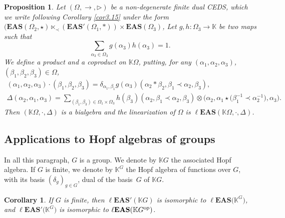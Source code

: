 \documentclass[pdftex]{sigma}
\numberwithin{equation}{section}
\newtheorem{Corollary}[Theorem]{Corollary}
\newtheorem{Proposition}[Theorem]{Proposition}
 { \theoremstyle{definition}
\newtheorem{Definition}[Theorem]{Definition}
\newtheorem{Note}[Theorem]{Note}
\newtheorem{Example}[Theorem]{Example}
\newtheorem{Remark}[Theorem]{Remark}
\newtheorem{Notation}[Theorem]{Notation}}
\newcommand{\eas}{\mathbf{EAS}}
\newcommand{\leas}{\ell\mathbf{EAS}}
\begin{document}
\begin{Proposition}
Let $(\Omega,\rightarrow,\triangleright)$ be a non-degenerate finite dual CEDS, which we write following Corollary {\rm\ref{cor3.15}} under the form
$(\eas(\Omega_2,\star) \ltimes_\prec (\eas'(\Omega_1,*))\times \eas(\Omega_3)$,
Let $g,h\colon\Omega_3\longrightarrow \mathbb{K}$ be two maps such that
\[\sum_{\alpha_3\in \Omega_3} g(\alpha_3)h(\alpha_3)=1.\]
We define a product and a coproduct on $\mathbb{K}\Omega$, putting, for any $(\alpha_1,\alpha_2,\alpha_3)$, $(\beta_1,\beta_2,\beta_3)\in \Omega$,
\begin{gather*}
(\alpha_1,\alpha_2,\alpha_3)\cdot(\beta_1,\beta_2,\beta_3)=\delta_{\alpha_1,\beta_1}g(\alpha_3)(\alpha_2*\beta_2,\beta_1\prec \alpha_2,\beta_3),\\
\Delta(\alpha_2,\alpha_1,\alpha_3)=\sum_{(\beta_1,\beta_3)\in \Omega_1\times \Omega_3}h(\beta_3)(\alpha_2,\beta_1\prec \alpha_2,\beta_3)\otimes \bigl(\alpha_2,\alpha_1\star\bigl(\beta_1^{-1}\prec \alpha_2^{-1}\bigr),\alpha_3\bigr).
\end{gather*}
Then $(\mathbb{K}\Omega,\cdot,\Delta)$ is a bialgebra and the linearization of $\Omega$ is $\leas(\mathbb{K}\Omega,\cdot,\Delta)$.
\end{Proposition}

\subsection{Applications to Hopf algebras of groups}

In all this paragraph, $G$ is a group. We denote by $\mathbb{K} G$ the associated Hopf algebra. If $G$ is finite, we denote by $\mathbb{K}^G$ the Hopf algebra of functions over $G$, with its basis $(\delta_g)_{g\in G}$, dual of the basis~$G$ of $\mathbb{K} G$.

\begin{Corollary}\label{cor5.15}
If $G$ is finite, then $\leas'(\mathbb{K} G)$ is isomorphic to $\leas\bigl(\mathbb{K}^G\bigr)$, and $\leas'\bigl(\mathbb{K}^G\bigr)$ is isomorphic to $\leas(\mathbb{K} G^{\rm op})$.
\end{Corollary}
\end{document}
